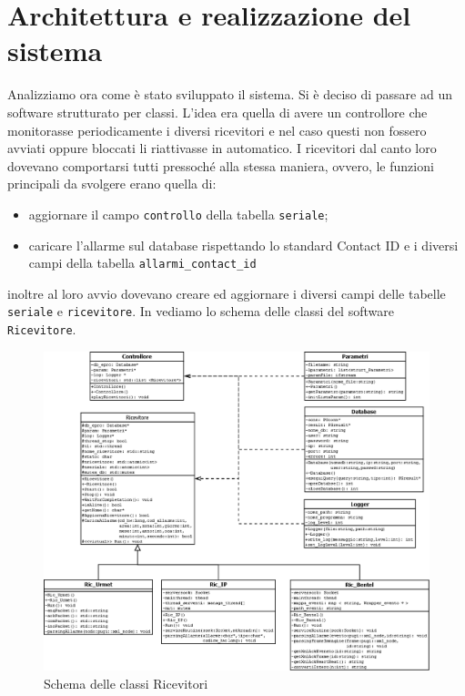 \section{Architettura e realizzazione del sistema}
Analizziamo ora come è stato sviluppato il sistema. Si è deciso di passare ad un software strutturato per classi. L'idea era quella di avere un controllore che monitorasse periodicamente i diversi ricevitori e nel caso questi non fossero avviati oppure bloccati li riattivasse in automatico. I ricevitori dal canto loro dovevano comportarsi tutti pressoché alla stessa maniera, ovvero, le funzioni principali da svolgere erano quella di:
\begin{itemize}
\item aggiornare il campo \texttt{controllo} della tabella \texttt{seriale};
\item caricare l'allarme sul database rispettando lo standard Contact ID e i diversi campi della tabella \texttt{allarmi\_contact\_id}
\end{itemize} 
inoltre al loro avvio dovevano creare ed aggiornare i diversi campi delle tabelle \texttt{seriale} e \texttt{ricevitore}. In  vediamo lo schema delle classi del software \texttt{Ricevitore}.
\begin{figure}[p]
	\centering
	\includegraphics[height=\textwidth, angle=90]{pictures/classiric.png}
	\caption{Schema delle classi Ricevitori}\label{fig:classiric}
\end{figure}
